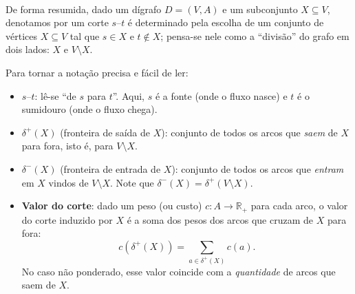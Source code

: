 \documentclass[12pt,a4paper]{article}
\begin{document}
\begin{center}
\label{fig:corte}
\end{center}

\paragraph{}
De forma resumida, dado um dígrafo \(D=(V,A)\) e um subconjunto \(X\subseteq V\), denotamos por um corte \(s\text{--}t\) é determinado pela escolha de um conjunto de vértices \(X\subseteq V\) tal que \(s\in X\) e \(t\notin X\); pensa-se nele como a “divisão” do grafo em dois lados: \(X\) e \(V\setminus X\).

Para tornar a notação precisa e fácil de ler:
\begin{itemize}
    \item \textbf{\(s\text{--}t\)}: lê-se “de \(s\) para \(t\)”. Aqui, \(s\) é a fonte (onde o fluxo nasce) e \(t\) é o sumidouro (onde o fluxo chega).
    \item \textbf{\(\delta^+(X)\)} (fronteira de saída de \(X\)): conjunto de todos os arcos que \emph{saem} de \(X\) para fora, isto é, para \(V\setminus X\).
    \item \textbf{\(\delta^-(X)\)} (fronteira de entrada de \(X\)): conjunto de todos os arcos que \emph{entram} em \(X\) vindos de \(V\setminus X\). Note que \(\delta^-(X)=\delta^+(V\setminus X)\).
    \item \textbf{Valor do corte}: dado um peso (ou custo) \(c:A\to\mathbb{R}_+\) para cada arco, o valor do corte induzido por \(X\) é a soma dos pesos dos arcos que cruzam de \(X\) para fora: 
    \[c(\delta^+(X))=\sum_{a\in\delta^+(X)} c(a).\]
    No caso não ponderado, esse valor coincide com a \emph{quantidade} de arcos que saem de \(X\).
\end{itemize}
\end{document}
